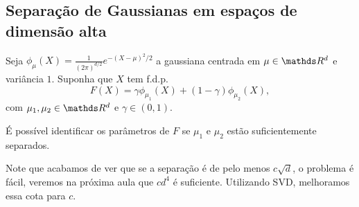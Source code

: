 \subsection{Separação de Gaussianas em espaços de dimensão alta}

Seja $\phi_{\mu}(X) = \frac{1}{(2\pi)^{d/2}}e^{-(X-\mu)^2/2}$ a
gaussiana centrada em $\mu\in \RR^d$ e variância $1$. Suponha
que $X$ tem f.d.p. 
$$F(X) = \gamma\phi_{\mu_1}(X) + (1- \gamma)\phi_{\mu_2}(X),$$
com $\mu_1, \mu_2 \in \RR^d$ e $\gamma\in (0,1)$.

\begin{fato}[Dasgupta]
É possível identificar os parâmetros de $F$ se $\mu_1$ e $\mu_2$
estão suficientemente separados.
\end{fato}
Note que acabamos de ver que se a separação é de pelo menos $c\sqrt{d}$, 
o problema é fácil, veremos na próxima aula que $cd^4$ é
suficiente. Utilizando SVD, melhoramos essa cota para $c$.


